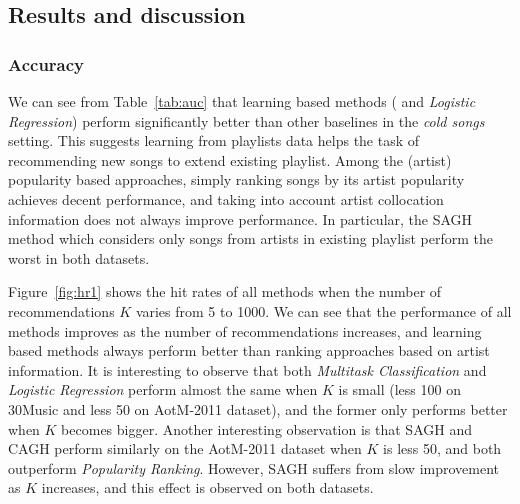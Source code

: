 \subsection{Results and discussion}


%

%

\subsubsection{Accuracy}

We can see from Table~\ref{tab:auc} that learning based methods (
and {\it Logistic Regression}) perform significantly better than other baselines in the \emph{cold songs} setting.
This suggests learning from playlists data helps the task of recommending new songs to extend existing playlist.
Among the (artist) popularity based approaches, 
simply ranking songs by its artist popularity achieves decent performance,
and taking into account artist collocation information does not always improve performance.
In particular, the SAGH method which considers only songs from artists in existing playlist
perform the worst in both datasets.

Figure~\ref{fig:hr1} shows the hit rates of all methods when the number of recommendations $K$ varies from 5 to 1000.
We can see that the performance of all methods improves as the number of recommendations increases,
and learning based methods always perform better than ranking approaches based on artist information.
It is interesting to observe that both {\it Multitask Classification} and {\it Logistic Regression} perform 
almost the same when $K$ is small (less 100 on 30Music and less 50 on AotM-2011 dataset), 
and the former only performs better when $K$ becomes bigger.
Another interesting observation is that SAGH and CAGH perform similarly on the AotM-2011 dataset when $K$
is less 50, and both outperform {\it Popularity Ranking}. However, SAGH suffers from slow improvement
as $K$ increases, and this effect is observed on both datasets.

